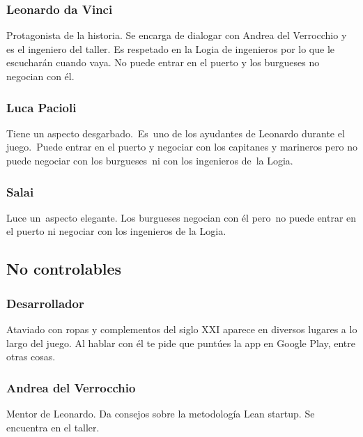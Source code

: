 \subsubsection[Leonardo da Vinci]{ Leonardo da Vinci}
\hypertarget{Toc484614226}{}{
Protagonista de la historia. Se encarga de dialogar con Andrea del Verrocchio y es el ingeniero del taller. Es respetado
en la Logia de ingenieros por lo que le escuchar\'an cuando vaya. No puede entrar en el puerto y los burgueses no
negocian con \'el.}

\subsubsection[Luca Pacioli]{ Luca Pacioli}
\hypertarget{Toc484614227}{}{
Tiene un aspecto desgarbado.\ Es\ uno de los ayudantes de Leonardo durante el juego.\ Puede entrar en el puerto y
negociar con los capitanes y marineros pero no puede negociar con los burgueses\ ni con los ingenieros de\ la Logia.}

\subsubsection[Salai]{ Salai}
\hypertarget{Toc484614228}{}{
Luce un\ aspecto elegante. Los burgueses negocian con \'el pero\ no puede entrar en el puerto ni negociar con los
ingenieros de la Logia.}

\subsection[No controlables]{ No controlables}
\hypertarget{Toc484614229}{}\subsubsection[Desarrollador]{ Desarrollador}
\hypertarget{Toc484614230}{}{
Ataviado con ropas y complementos del siglo XXI aparece en diversos lugares a lo largo del juego. Al hablar con \'el te
pide que punt\'ues la app en Google Play, entre otras cosas.}

\subsubsection[Andrea del Verrocchio]{ Andrea del Verrocchio}
\hypertarget{Toc484614231}{}{
Mentor de Leonardo. Da consejos sobre la metodolog\'ia Lean startup. Se encuentra en el taller.}

